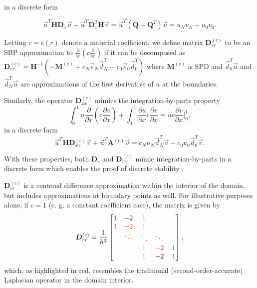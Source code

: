 \noindent in a discrete form

\begin{equation}
  \vec{u}^T \boldsymbol{H} \boldsymbol{D}_{x}\vec{v} + \vec{u}^T \boldsymbol{D}_{x}^{T} \boldsymbol{H}\vec{v}
  =
  \vec{u}^T\left( \boldsymbol{Q} + \boldsymbol{Q}^T\right)\vec{v}
  =
  u_{N}v_{N} - u_{0}v_{0}.
  \label{eqn:1d_sbp}
\end{equation} 

\begin{definition}
  Letting $c = c(r)$ denote a material coefficient, we define matrix $\boldsymbol{D}^{(c)}_{rr}$ to be an SBP approximation to
  $\frac{\partial }{\partial r}\left(c \frac{\partial}{\partial r}\right)$ if it
  can be decomposed as $\boldsymbol{D}^{(c)}_{rr} =\boldsymbol{H}^{-1}(-\boldsymbol{M}^{(c)} +
  c_N\vec{e}_{N}\vec{d}_{N}^{T} -c_0\vec{e}_{0}\vec{d}_{0}^{T})$ where
  $\boldsymbol{M}^{(c)}$ is SPD and $\vec{d}_{0}^{T}\vec{u}$ and
  $\vec{d}_{N}^{T}\vec{u}$ are approximations of the first derivative of $u$ at
  the boundaries.
\end{definition}
%
Similarly, the operator $\boldsymbol{D}_{xx}^{(c)}$ mimics the integration-by-parts property
\begin{equation}
  \int_0^1 u \frac{\partial}{\partial x}\left(c\frac{\partial v}{\partial x}\right)
 + \int_0^1 \frac{\partial u}{\partial x} c\frac{\partial v}{\partial x}
  =
    u c \frac{\partial v}{\partial x} \bigg|_0^1,
    \label{eqn:2d_ibp}
\end{equation}
in a discrete form
\begin{equation}
  \vec{u}^T \boldsymbol{H} \boldsymbol{D}^{(c)}_{xx}\vec{v}
  +\vec{u}^T\boldsymbol{A}^{(c)}\vec{v}
  =
    c_{N}u_{N} \vec{d}_{N}^{T}\vec{v}
  - c_{0}u_{0} \vec{d}_{0}^{T}\vec{v}.
  \label{eqn:2d_sbp}
\end{equation}



With these properties, both $\boldsymbol{D}_{r}$ and $\boldsymbol{D}^{(c)}_{rr}$ mimic integration-by-parts in a discrete form which enables the proof of discrete stability \cite{MN04, Mattsson2009}. 


$\boldsymbol{D}^{(c)}_{rr}$ is a centered difference approximation within the interior of the domain, but includes approximations at boundary points as well. For illustrative purposes alone, if $c = 1$ (e. g. a constant coefficient case), the matrix is given by 
\[
    \boldsymbol{D}^{(c)}_{rr} = \frac{1}{h^2}\begin{bmatrix}
    1 & -2 & 1\\
    {\color{red}1} & {\color{red}-2} & {\color{red}1}\\
    & {\color{red}\ddots} &{\color{red}\ddots} & {\color{red}\ddots}\\
    & & {\color{red}1} &{\color{red}-2} &{\color{red} 1}\\
    & & 1 &-2& \,1 
    \end{bmatrix},
\]
which, as highlighted in red, resembles the traditional (second-order-accurate) Laplacian operator in the domain interior. 




